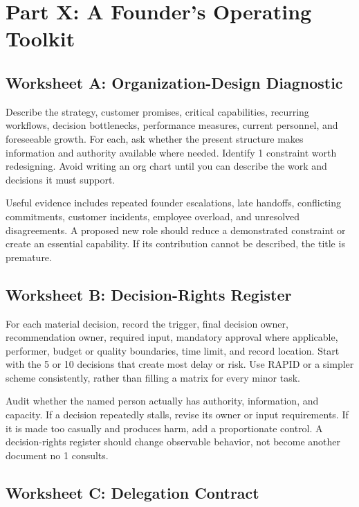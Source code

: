 \section*{Part X: A Founder's Operating Toolkit}

\subsection{Worksheet A: Organization-Design Diagnostic}
\label{sec:worksheet_org_design_diagnostic}

Describe the strategy, customer promises, critical capabilities, recurring workflows, decision bottlenecks, performance measures, current personnel, and foreseeable growth. For each, ask whether the present structure makes information and authority available where needed. Identify 1 constraint worth redesigning. Avoid writing an org chart until you can describe the work and decisions it must support.

Useful evidence includes repeated founder escalations, late handoffs, conflicting commitments, customer incidents, employee overload, and unresolved disagreements. A proposed new role should reduce a demonstrated constraint or create an essential capability. If its contribution cannot be described, the title is premature.

\subsection{Worksheet B: Decision-Rights Register}
\label{sec:worksheet_decision_rights_register}

For each material decision, record the trigger, final decision owner, recommendation owner, required input, mandatory approval where applicable, performer, budget or quality boundaries, time limit, and record location. Start with the 5 or 10 decisions that create most delay or risk. Use RAPID or a simpler scheme consistently, rather than filling a matrix for every minor task.

Audit whether the named person actually has authority, information, and capacity. If a decision repeatedly stalls, revise its owner or input requirements. If it is made too casually and produces harm, add a proportionate control. A decision-rights register should change observable behavior, not become another document no 1 consults.

\subsection{Worksheet C: Delegation Contract}
\label{sec:worksheet_delegation_contract}

